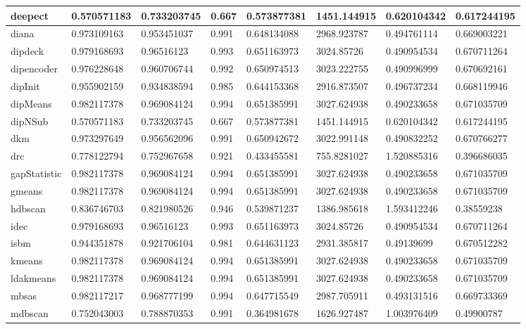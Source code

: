 \begin{table}[H]
\begin{tabular}{|l|l|l|l|l|l|l|l|}
\hline
deepect & 0.570571183 & 0.733203745 & 0.667 & 0.573877381 & 1451.144915 & 0.620104342 & 0.617244195 \\
\hline
diana & 0.973109163 & 0.953451037 & 0.991 & 0.648134088 & 2968.923787 & 0.494761114 & 0.669003221 \\
\hline
dipdeck & 0.979168693 & 0.96516123 & 0.993 & 0.651163973 & 3024.85726 & 0.490954534 & 0.670711264 \\
\hline
dipencoder & 0.976228648 & 0.960706744 & 0.992 & 0.650974513 & 3023.222755 & 0.490996999 & 0.670692161 \\
\hline
dipInit & 0.955902159 & 0.934838594 & 0.985 & 0.644153368 & 2916.873507 & 0.496737234 & 0.668119946 \\
\hline
dipMeans & 0.982117378 & 0.969084124 & 0.994 & 0.651385991 & 3027.624938 & 0.490233658 & 0.671035709 \\
\hline
dipNSub & 0.570571183 & 0.733203745 & 0.667 & 0.573877381 & 1451.144915 & 0.620104342 & 0.617244195 \\
\hline
dkm & 0.973297649 & 0.956562096 & 0.991 & 0.650942672 & 3022.991148 & 0.490832252 & 0.670766277 \\
\hline
drc & 0.778122794 & 0.752967658 & 0.921 & 0.433455581 & 755.8281027 & 1.520885316 & 0.396686035 \\
\hline
gapStatistic & 0.982117378 & 0.969084124 & 0.994 & 0.651385991 & 3027.624938 & 0.490233658 & 0.671035709 \\
\hline
gmeans & 0.982117378 & 0.969084124 & 0.994 & 0.651385991 & 3027.624938 & 0.490233658 & 0.671035709 \\
\hline
hdbscan & 0.836746703 & 0.821980526 & 0.946 & 0.539871237 & 1386.985618 & 1.593412246 & 0.38559238 \\
\hline
idec & 0.979168693 & 0.96516123 & 0.993 & 0.651163973 & 3024.85726 & 0.490954534 & 0.670711264 \\
\hline
isbm & 0.944351878 & 0.921706104 & 0.981 & 0.644631123 & 2931.385817 & 0.49139699 & 0.670512282 \\
\hline
kmeans & 0.982117378 & 0.969084124 & 0.994 & 0.651385991 & 3027.624938 & 0.490233658 & 0.671035709 \\
\hline
ldakmeans & 0.982117378 & 0.969084124 & 0.994 & 0.651385991 & 3027.624938 & 0.490233658 & 0.671035709 \\
\hline
mbsas & 0.982117217 & 0.968777199 & 0.994 & 0.647715549 & 2987.705911 & 0.493131516 & 0.669733369 \\
\hline
mdbscan & 0.752043003 & 0.788870353 & 0.991 & 0.364981678 & 1626.927487 & 1.003976409 & 0.49900787 \\

\end{tabular}
\end{table}
